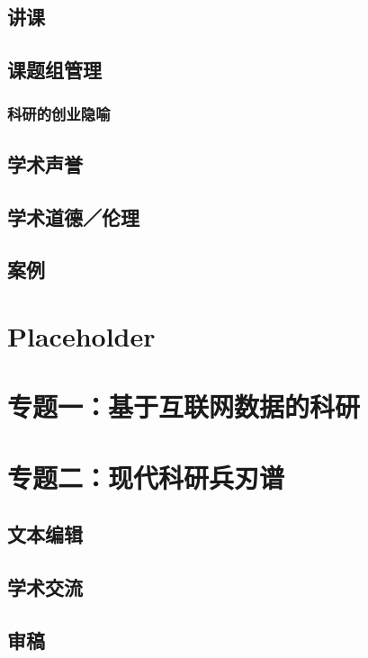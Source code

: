 \documentclass[]{book}
\begin{document}
\section{讲课}

\section{课题组管理}

\subsection{科研的创业隐喻}

\section{学术声誉}

\section{学术道德／伦理}

\section{案例}

\chapter{Placeholder}\label{placeholder}

\chapter{专题一：基于互联网数据的科研}

\chapter{专题二：现代科研兵刃谱}

\section{文本编辑}

\section{学术交流}

\section{审稿}\label{-1}
\end{document}
